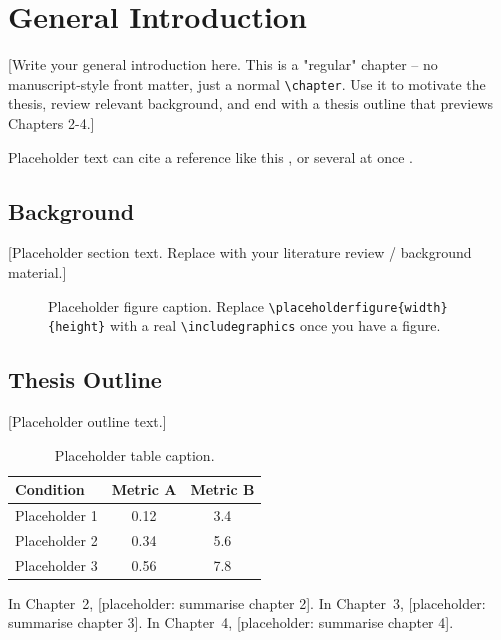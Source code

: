\documentclass[../main.tex]{subfiles}
\begin{document}
\chapter{General Introduction}
[Write your general introduction here. This is a "regular" chapter -- no
manuscript-style front matter, just a normal \texttt{\textbackslash chapter}.
Use it to motivate the thesis, review relevant background, and end with a
thesis outline that previews Chapters 2-4.]

Placeholder text can cite a reference like this \cite{Placeholder2020}, or
several at once \cite{Placeholder2021, Placeholder2015Book}.

\section{Background}
[Placeholder section text. Replace with your literature review / background
material.]

\begin{figure}[htbp]
  \caption{Placeholder figure caption. Replace \texttt{\textbackslash placeholderfigure\{width\}\{height\}} with a real \texttt{\textbackslash includegraphics} once you have a figure.}
  \label{fig:ch1-placeholder}
\end{figure}

\section{Thesis Outline}
[Placeholder outline text.]

\begin{table}[htbp]
  \centering
  \caption{Placeholder table caption.}
  \label{tab:ch1-placeholder}
  \begin{tabular}{lcc}
    \toprule
    Condition & Metric A & Metric B \\
    \midrule
    Placeholder 1 & 0.12 & 3.4 \\
    Placeholder 2 & 0.34 & 5.6 \\
    Placeholder 3 & 0.56 & 7.8 \\
    \bottomrule
  \end{tabular}
\end{table}

In Chapter~2, [placeholder: summarise chapter 2].
In Chapter~3, [placeholder: summarise chapter 3].
In Chapter~4, [placeholder: summarise chapter 4].
\end{document}
